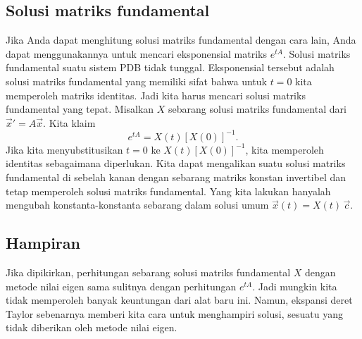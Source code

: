 \subsection{Solusi matriks fundamental}

Jika Anda dapat menghitung solusi matriks fundamental
dengan cara lain, Anda dapat menggunakannya untuk mencari eksponensial matriks $e^{tA}$.
Solusi matriks fundamental suatu sistem PDB tidak tunggal.  Eksponensial tersebut
adalah solusi matriks fundamental yang memiliki sifat bahwa
untuk $t=0$ kita memperoleh matriks identitas.  Jadi kita
harus mencari solusi matriks fundamental yang tepat.  Misalkan $X$ sebarang solusi
matriks fundamental dari ${\vec{x}}' = A \vec{x}$.  Kita klaim
\begin{equation*}
e^{tA} = X(t) \left[ X(0) \right]^{-1} .
\end{equation*}
Jika kita menyubstitusikan $t=0$ ke 
$X(t) \left[ X(0) \right]^{-1}$, kita memperoleh identitas sebagaimana diperlukan.
Kita dapat mengalikan suatu solusi matriks fundamental di sebelah kanan dengan sebarang
matriks konstan invertibel dan tetap memperoleh solusi matriks fundamental.
Yang kita lakukan hanyalah mengubah konstanta-konstanta sebarang dalam solusi
umum $\vec{x}(t) = X(t)\, \vec{c}$.

\subsection{Hampiran}

Jika dipikirkan, perhitungan sebarang solusi matriks fundamental
$X$ dengan metode nilai eigen
sama sulitnya dengan perhitungan $e^{tA}$.
Jadi mungkin kita tidak memperoleh
banyak keuntungan dari alat baru ini.  Namun, ekspansi deret Taylor sebenarnya memberi
kita cara untuk menghampiri solusi, sesuatu yang tidak diberikan
oleh metode nilai eigen.


